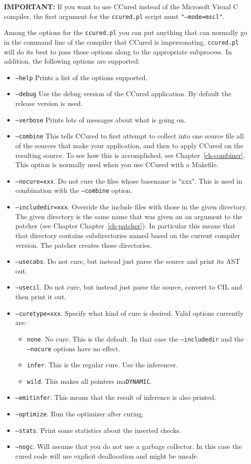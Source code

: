 \documentclass{book}
\def\t#1{{\tt #1}}
\def\DYNAMIC{\t{DYNAMIC}}
\def\chref#1{Chapter~\ref{ch-#1}}
\begin{document}
 {\bf IMPORTANT:} If you want to use CCured instead of the Microsoft Visual C
compiler, the first argument for the \t{ccured.pl} script must
\t{"--mode=mscl"}. 

 Among the options for the \t{ccured.pl} you can put anything that can
normally go in the command line of the compiler that CCured is impersonating.
\t{ccured.pl} will do its best to pass those options along to the appropriate
subprocess. In addition, the following options are supported:

\begin{itemize}
\item \t{--help} Prints a list of the options supported.
\item \t{--debug} Use the debug version of the CCured application. By default
the release version is used.
\item \t{--verbose} Prints lots of messages about what is going on.
\item \t{--combine} This tells CCured to first attempt to collect into one
source file all of the sources that make your application, and then to apply
CCured on the resulting source. To see how this is accomplished, see
\chref{combiner}. This option is normally used when you use CCured with a
Makefile.
\item \t{--nocure=xxx}. Do not cure the files whose basename is "xxx". This is
used in combination with the \t{--combine} option.
\item \t{--includedir=xxx}. Override the include files with those in the given
directory. The given directory is the same name that was given an an argument
to the patcher (see Chapter \chref{patcher}). In particular this means that
that directory contains subdirectories named based on the current compiler
version. The patcher creates those directories. 
\item \t{--usecabs}. Do not cure, but instead just parse the source and print
its AST out. 
\item \t{--usecil}. Do not cure, but instead just parse the source, convert to
CIL and then print it out. 
\item \t{--curetype=xxx}. Specify what kind of cure is desired. Valid options
currently are:
   \begin{itemize}
    \item \t{none}. No cure. This is the default. In that case the
           \t{--includedir} and the \t{--nocure} options have no effect. 
    \item \t{infer}. This is the regular cure. Use the inferencer.
    \item \t{wild}. This makes all pointers ma\DYNAMIC{}.
   \end{itemize}
\item \t{--emitinfer}. This means that the result of inference is also
printed. 
\item \t{--optimize}. Run the optimizer after curing.
\item \t{--stats}. Print some statistics about the inserted checks.
\item \t{--nogc}. Will assume that you do not use a garbage collector. In this
case the cured code will use explicit deallocation and might be unsafe.
\end{itemize}
\end{document}
